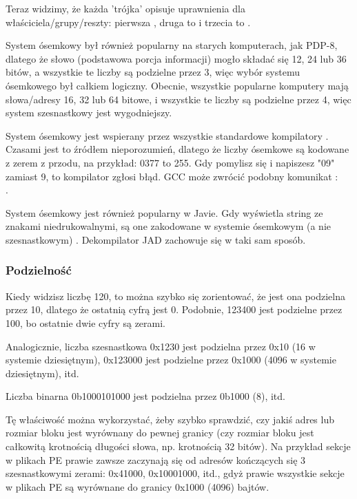 Teraz widzimy, że każda 'trójka' opisuje uprawnienia dla właściciela/grupy/reszty: pierwsza , druga to  i trzecia to .

System ósemkowy był również popularny na starych komputerach, jak PDP-8, dlatego że słowo (podstawowa porcja informacji) mogło składać się 12, 24 lub
36 bitów, a wszystkie te liczby są podzielne przez 3, więc wybór systemu ósemkowego był całkiem logiczny.
Obecnie, wszystkie popularne komputery mają słowa/adresy 16, 32 lub 64 bitowe, i wszystkie te liczby są podzielne przez 4,
więc system szesnastkowy jest wygodniejszy.

System ósemkowy jest wspierany przez wszystkie standardowe kompilatory \CCpp{}.
Czasami jest to źródłem nieporozumień, dlatego że liczby ósemkowe są kodowane z zerem z przodu, na przykład: 0377 to 255.
Gdy pomylisz się i napiszesz "09" zamiast 9, to kompilator zgłosi błąd.
GCC może zwrócić podobny komunikat :\\
.

System ósemkowy jest również popularny w Javie. Gdy \IDA wyświetla string ze znakami niedrukowalnymi, są one zakodowane w systemie ósemkowym (a nie szesnastkowym)
.
Dekompilator JAD zachowuje się w taki sam sposób.

\subsubsection{Podzielność}

Kiedy widzisz liczbę 120, to można szybko się zorientować, że jest ona podzielna przez 10, dlatego że ostatnią cyfrą jest 0.
Podobnie, 123400 jest podzielne przez 100, bo ostatnie dwie cyfry są zerami.

Analogicznie, liczba szesnastkowa 0x1230 jest podzielna przez 0x10 (16 w systemie dziesiętnym), 0x123000 jest podzielne przez 0x1000 (4096 w systemie dziesiętnym), itd.

Liczba binarna 0b1000101000 jest podzielna przez 0b1000 (8), itd.

Tę właściwość można wykorzystać, żeby szybko sprawdzić,
czy jakiś adres lub rozmiar bloku jest wyrównany do pewnej granicy (czy rozmiar bloku jest całkowitą krotnością długości słowa, np. krotnością 32 bitów).
Na przykład sekcje w plikach \ac{PE} prawie zawsze zaczynają się od adresów kończących się 3 szesnastkowymi zerami: 0x41000, 0x10001000, itd., gdyż prawie wszystkie sekcje w plikach \ac{PE} są wyrównane do granicy 0x1000 (4096) bajtów.

